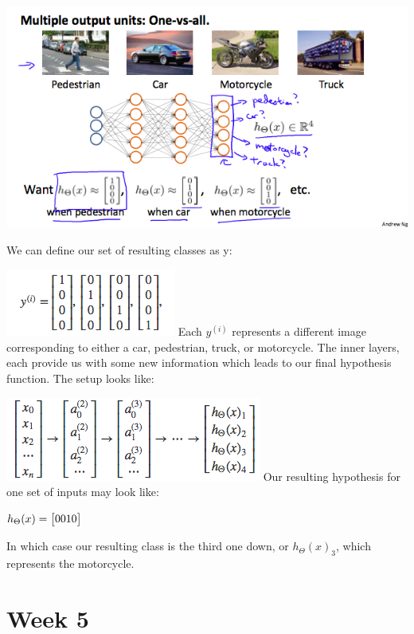 \documentclass[
]{book}
\begin{document}
\includegraphics{Multiclass1.png}

We can define our set of resulting classes as y:

\includegraphics{Multiclass2.png}
Each \(y^{(i)}\) represents a different image corresponding to either a car, pedestrian, truck, or motorcycle. The inner layers, each provide us with some new information which leads to our final hypothesis function. The setup looks like:

\includegraphics{Multiclass3.png}
Our resulting hypothesis for one set of inputs may look like:

\(h_\Theta(x) =\begin{bmatrix}0 \newline 0 \newline 1 \newline 0 \newline\end{bmatrix}\)

In which case our resulting class is the third one down, or \(h_\Theta(x)_3\), which represents the motorcycle.

\hypertarget{week-5}{%
\chapter{Week 5}\label{week-5}}
\end{document}
